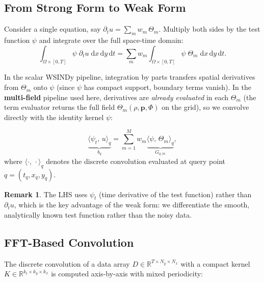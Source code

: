 \documentclass[11pt, letterpaper]{article}
\theoremstyle{definition}
\newtheorem{remark}{Remark}[section]
\newcommand{\R}{\mathbb{R}}
\newcommand{\vp}{\mathbf{p}}
\newcommand{\ip}[2]{\langle #1 ,\, #2 \rangle}
\newcommand{\dd}{\mathrm{d}}
\begin{document}
\subsection{From Strong Form to Weak Form}
\label{sec:ibp}

Consider a single equation, say $\partial_t u = \sum_m w_m\,\Theta_m$.
Multiply both sides by the test function $\psi$ and integrate over
the full space-time domain:
\begin{equation}
\label{eq:weak-integral}
  \int_{\Omega \times [0,T]}
    \psi \;\partial_t u \;\dd x\,\dd y\,\dd t
  =
  \sum_{m} w_m
  \int_{\Omega \times [0,T]}
    \psi \;\Theta_m \;\dd x\,\dd y\,\dd t.
\end{equation}

In the scalar WSINDy pipeline, integration by parts transfers
spatial derivatives from $\Theta_m$ onto $\psi$ (since $\psi$ has
compact support, boundary terms vanish).  In the \textbf{multi-field}
pipeline used here, derivatives are \emph{already evaluated} in each
$\Theta_m$ (the term evaluator returns the full field
$\Theta_m(\rho, \vp, \Phi)$ on the grid), so we convolve
directly with the identity kernel $\psi$:

\begin{equation}
\label{eq:multi-field-weak}
  \underbrace{\ip{\psi_t}{u}_{q}}_{\displaystyle b_q}
  = \sum_{m=1}^{M}
    w_m \underbrace{\ip{\psi}{\Theta_m}_{q}}_{\displaystyle G_{q,m}},
\end{equation}
where $\ip{\cdot}{\cdot}_q$ denotes the discrete convolution
evaluated at query point $q = (t_q, x_q, y_q)$.

\begin{remark}
The LHS uses $\psi_t$ (time derivative of the test function)
rather than $\partial_t u$, which is the key advantage of the weak
form: we differentiate the smooth, analytically known test function
rather than the noisy data.
\end{remark}

\subsection{FFT-Based Convolution}
\label{sec:fft-conv}

The discrete convolution of a data array
$D \in \R^{T \times N_y \times N_x}$ with a compact kernel
$K \in \R^{k_t \times k_y \times k_x}$ is computed axis-by-axis with
mixed periodicity:
\end{document}
